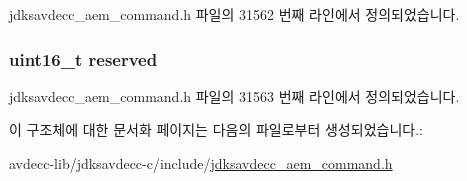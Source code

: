 jdksavdecc\+\_\+aem\+\_\+command.\+h 파일의 31562 번째 라인에서 정의되었습니다.

\subsubsection[{\texorpdfstring{reserved}{reserved}}]{\setlength{\rightskip}{0pt plus 5cm}uint16\+\_\+t reserved}\hypertarget{structjdksavdecc__aem__command__get__sensor__map_a5a6ed8c04a3db86066924b1a1bf4dad3}{}\label{structjdksavdecc__aem__command__get__sensor__map_a5a6ed8c04a3db86066924b1a1bf4dad3}


jdksavdecc\+\_\+aem\+\_\+command.\+h 파일의 31563 번째 라인에서 정의되었습니다.



이 구조체에 대한 문서화 페이지는 다음의 파일로부터 생성되었습니다.\+:\begin{DoxyCompactItemize}
\item 
avdecc-\/lib/jdksavdecc-\/c/include/\hyperlink{jdksavdecc__aem__command_8h}{jdksavdecc\+\_\+aem\+\_\+command.\+h}\end{DoxyCompactItemize}
